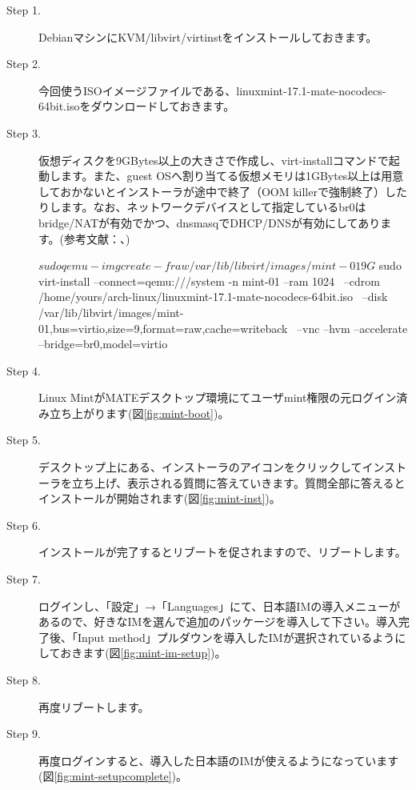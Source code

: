 \documentclass[mingoth,a4paper]{jsarticle}
\begin{document}
\begin{description}
\item [Step 1.] DebianマシンにKVM/libvirt/virtinstをインストールしておきます。
\item [Step 2.] 今回使うISOイメージファイルである、linuxmint-17.1-mate-nocodecs-64bit.isoをダウンロードしておきます。
\item [Step 3.] 仮想ディスクを9GBytes以上の大きさで作成し、virt-installコマンドで起動します。また、guest OSへ割り当てる仮想メモリは1GBytes以上は用意しておかないとインストーラが途中で終了（OOM killerで強制終了）したりします。なお、ネットワークデバイスとして指定しているbr0はbridge/NATが有効でかつ、dnsmasqでDHCP/DNSが有効にしてあります。(参考文献：\cite{ref:kde-devel-debian}、\cite{ref:dnsmasq})
     \begin{commandline}
$ sudo qemu-img create -f raw /var/lib/libvirt/images/mint-01 9G
$ sudo virt-install --connect=qemu:///system -n mint-01 --ram 1024 \
     --cdrom /home/yours/arch-linux/linuxmint-17.1-mate-nocodecs-64bit.iso \
     --disk /var/lib/libvirt/images/mint-01,bus=virtio,size=9,format=raw,cache=writeback \
     --vnc --hvm --accelerate --bridge=br0,model=virtio
   \end{commandline}
   \item [Step 4.] Linux MintがMATEデスクトップ環境にてユーザmint権限の元ログイン済み立ち上がります(図\ref{fig:mint-boot})。
   \item [Step 5.] デスクトップ上にある、インストーラのアイコンをクリックしてインストーラを立ち上げ、表示される質問に答えていきます。質問全部に答えるとインストールが開始されます(図\ref{fig:mint-inst})。
   \item [Step 6.] インストールが完了するとリブートを促されますので、リブートします。
   \item [Step 7.] ログインし、「設定」→「Languages」にて、日本語IMの導入メニューがあるので、好きなIMを選んで追加のパッケージを導入して下さい。導入完了後、「Input method」プルダウンを導入したIMが選択されているようにしておきます(図\ref{fig:mint-im-setup})。
   \item [Step 8.] 再度リブートします。
   \item [Step 9.] 再度ログインすると、導入した日本語のIMが使えるようになっています(図\ref{fig:mint-setupcomplete})。
\end{description}
\end{document}
